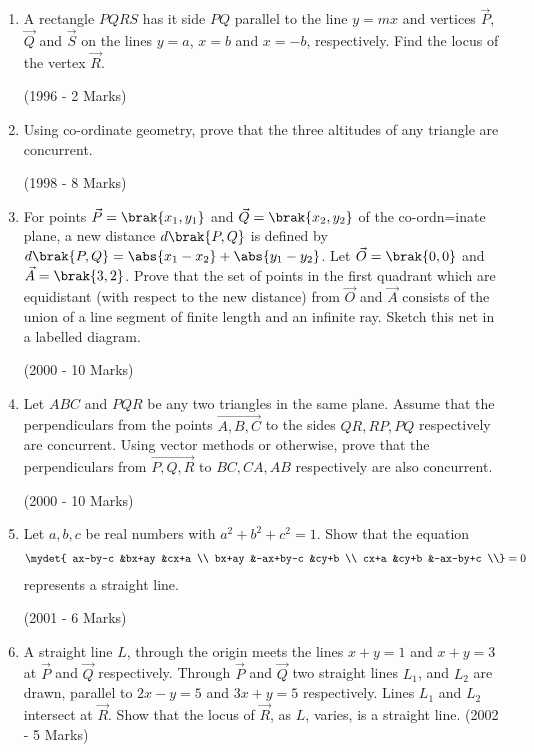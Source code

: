 \begin{enumerate}
\item A rectangle $PQRS$ has it side $PQ$ parallel to the line $y=mx$ 
	and vertices $\vec{P}$, $\vec{Q}$ and $\vec{S}$ on the lines $y=a$, $x=b$ and $x=-b$, 
		respectively. Find the locus of the vertex $\vec{R}$.
	
		\hfill{(1996 - 2 Marks)}

\item Using co-ordinate geometry, prove that the three altitudes of any triangle are concurrent.

	\hfill{(1998 - 8 Marks)}

\item For points $\vec{P}=\brak{x_{1}, y_{1}}$ and $\vec{Q}=\brak{x_{2}, y_{2}}$ of the co-ordn=inate plane, a new distance $d\brak{P, Q}$ is defined by $d\brak{P, Q}=\abs{x_{1}-x_{2}}+\abs{y_{1}-y_{2}}$. Let $\vec{O}=\brak{0, 0}$ and $\vec{A}=\brak{3, 2}$. Prove that the set of points in the first quadrant which are equidistant (with respect to the new distance) from $\vec{O}$ and $\vec{A}$ consists of the union of a line segment of finite length and an infinite ray. Sketch this net in a labelled diagram.

	\hfill{(2000 - 10 Marks)}

\item Let $ABC$ and $PQR$ be any two triangles in the same plane.
	Assume that the perpendiculars from the points $\vec{A, B, C}$ to 
		the sides $QR, RP, PQ$ respectively are concurrent. Using vector methods or otherwise, prove that the perpendiculars from $\vec{P, Q, R}$ to $BC, CA, AB$ respectively are also concurrent. 

	\hfill{(2000 - 10 Marks)}

\item Let $a, b, c$ be real numbers with $a^{2}+b^{2}+c^{2}=1$. Show that the equation 
	\begin{align}
		\mydet{
ax-by-c     &bx+ay       &cx+a      \\
bx+ay       &-ax+by-c   &cy+b       \\
cx+a         &cy+b         &-ax-by+c \\} =0
	\end{align}
represents a straight line.

\hfill{(2001 - 6 Marks)}

\item A straight line $L$, through the origin meets the lines $x+y=1$ and $x+y=3$ at $\vec{P}$ and $\vec{Q}$ respectively. Through $\vec{P}$ and $\vec{Q}$ two 
	straight lines $L_{1}$, and $L_{2}$ are drawn, parallel to $2x-y=5$ and $3x+y=5$ respectively. Lines $L_{1}$ and $L_{2}$ intersect at $\vec{R}$. Show 
		that the locus of $\vec{R}$, as $L$, varies, is a straight line. 
\hfill{(2002 - 5 Marks)}


\end{enumerate}
